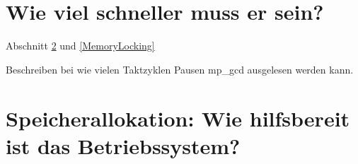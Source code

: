 



















\section{Wie viel schneller muss er sein?}
\label{Howfast}

Abschnitt \ref{} und \ref{MemoryLocking}

Beschreiben bei wie vielen Taktzyklen Pausen mp_gcd ausgelesen werden kann.

\section{Speicherallokation: Wie hilfsbereit ist das Betriebssystem?}


